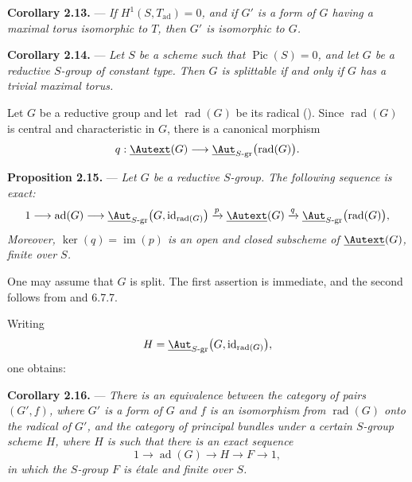\medskip\noindent\textbf{Corollary 2.13.} ---
{\itshape If \(H^1(S,T_{\mathrm{ad}})=0\), and if \(G'\) is a form of
\(G\) having a maximal torus isomorphic to \(T\), then \(G'\) is
isomorphic to \(G\).}

\medskip\noindent\textbf{Corollary 2.14.} ---
{\itshape Let \(S\) be a scheme such that \(\operatorname{Pic}(S)=0\),
and let \(G\) be a reductive \(S\)-group of constant type. Then \(G\)
is splittable if and only if \(G\) has a trivial maximal torus.}

Let \(G\) be a reductive group and let
\(\operatorname{rad}(G)\) be its radical ().
Since \(\operatorname{rad}(G)\) is central and characteristic in
\(G\), there is a canonical morphism
\[
  q:\underline{\Autext}(G)
  \longrightarrow
  \underline{\Aut}_{S\text{-}\mathrm{gr}}
    \bigl(\operatorname{rad}(G)\bigr).
\]


\medskip\noindent\textbf{Proposition 2.15.} ---
{\itshape Let \(G\) be a reductive \(S\)-group. The following sequence
is exact:}
\[
  1\longrightarrow
  \operatorname{ad}(G)
  \longrightarrow
  \underline{\Aut}_{S\text{-}\mathrm{gr}}
    \bigl(G,\operatorname{id}_{\operatorname{rad}(G)}\bigr)
  \xrightarrow{p}
  \underline{\Autext}(G)
  \xrightarrow{q}
  \underline{\Aut}_{S\text{-}\mathrm{gr}}
    \bigl(\operatorname{rad}(G)\bigr),
\]
{\itshape Moreover, \(\ker(q)=\operatorname{im}(p)\) is an open and closed
subscheme of \(\underline{\Autext}(G)\), finite over \(S\).}

One may assume that \(G\) is split. The first assertion is immediate,
and the second follows from  and 6.7.7.

Writing
\[
  H=
  \underline{\Aut}_{S\text{-}\mathrm{gr}}
    \bigl(G,\operatorname{id}_{\operatorname{rad}(G)}\bigr),
\]
one obtains:

\medskip\noindent\textbf{Corollary 2.16.} ---
{\itshape There is an equivalence between the category of pairs
\((G',f)\), where \(G'\) is a form of \(G\) and \(f\) is an
isomorphism from \(\operatorname{rad}(G)\) onto the radical of \(G'\),
and the category of principal bundles under a certain \(S\)-group
scheme \(H\), where \(H\) is such that there is an exact sequence}
\[
  1\longrightarrow \operatorname{ad}(G)
  \longrightarrow H
  \longrightarrow F
  \longrightarrow 1,
\]
{\itshape in which the \(S\)-group \(F\) is étale and finite over
\(S\).}

